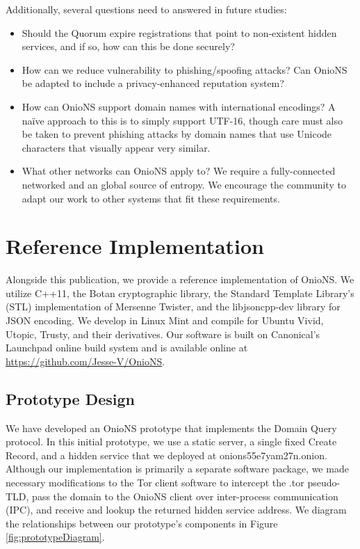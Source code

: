 \documentclass{sig-alternate}
\begin{document}
Additionally, several questions need to answered in future studies:

\begin{itemize}
	\item Should the Quorum expire registrations that point to non-existent hidden services, and if so, how can this be done securely?
	\item How can we reduce vulnerability to phishing/spoofing attacks? Can OnioNS be adapted to include a privacy-enhanced reputation system?
	\item How can OnioNS support domain names with international encodings? A na\"{i}ve approach to this is to simply support UTF-16, though care must also be taken to prevent phishing attacks by domain names that use Unicode characters that visually appear very similar.
	\item What other networks can OnioNS apply to? We require a fully-connected networked and an global source of entropy. We encourage the community to adapt our work to other systems that fit these requirements.
\end{itemize}

\section{Reference Implementation}

Alongside this publication, we provide a reference implementation of OnioNS. We utilize C++11, the Botan cryptographic library, the Standard Template Library's (STL) implementation of Mersenne Twister, and the libjsoncpp-dev library for JSON encoding. We develop in Linux Mint and compile for Ubuntu Vivid, Utopic, Trusty, and their derivatives. Our software is built on Canonical's Launchpad online build system and is available online at \url{https://github.com/Jesse-V/OnioNS}. 

\subsection{Prototype Design}

We have developed an OnioNS prototype that implements the Domain Query protocol. In this initial prototype, we use a static server, a single fixed Create Record, and a hidden service that we deployed at onions55e7yam27n.onion. Although our implementation is primarily a separate software package, we made necessary modifications to the Tor client software to intercept the .tor pseudo-TLD, pass the domain to the OnioNS client over inter-process communication (IPC), and receive and lookup the returned hidden service address. We diagram the relationships between our prototype's components in Figure \ref{fig:prototypeDiagram}.
\end{document}
